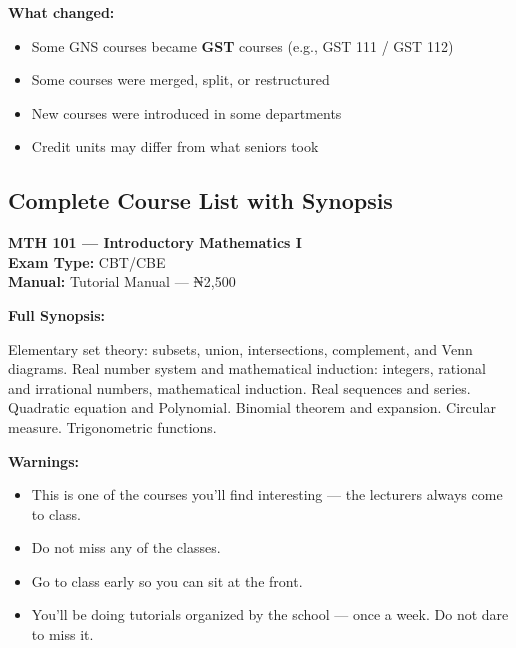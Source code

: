 \documentclass[11pt,a4paper]{article}
\begin{document}
\textbf{What changed:}
\begin{itemize}[leftmargin=1.5em, itemsep=0.2em]
    \item Some GNS courses became \textbf{GST} courses (e.g., GST 111 / GST 112)
    \item Some courses were merged, split, or restructured
    \item New courses were introduced in some departments
    \item Credit units may differ from what seniors took
\end{itemize}

\subsection*{Complete Course List with Synopsis}

\begin{coursebox}
    \textbf{\color{primary}\Large MTH 101 --- Introductory Mathematics I}\\[0.3em]
    \textbf{Exam Type:} CBT/CBE \\
    \textbf{Manual:} Tutorial Manual --- ₦2,500

    \vspace{0.8em}

    \textbf{Full Synopsis:}

    Elementary set theory: subsets, union, intersections, complement, and Venn diagrams. Real number system and mathematical induction: integers, rational and irrational numbers, mathematical induction. Real sequences and series. Quadratic equation and Polynomial. Binomial theorem and expansion. Circular measure. Trigonometric functions.

    \vspace{0.8em}

    \textbf{\color{warningText}Warnings:}
    \begin{itemize}[leftmargin=1.5em, itemsep=0.2em]
        \item This is one of the courses you'll find interesting --- the lecturers always come to class.
        \item Do not miss any of the classes.
        \item Go to class early so you can sit at the front.
        \item You'll be doing tutorials organized by the school --- once a week. Do not dare to miss it.
    \end{itemize}
\end{coursebox}
\end{document}
